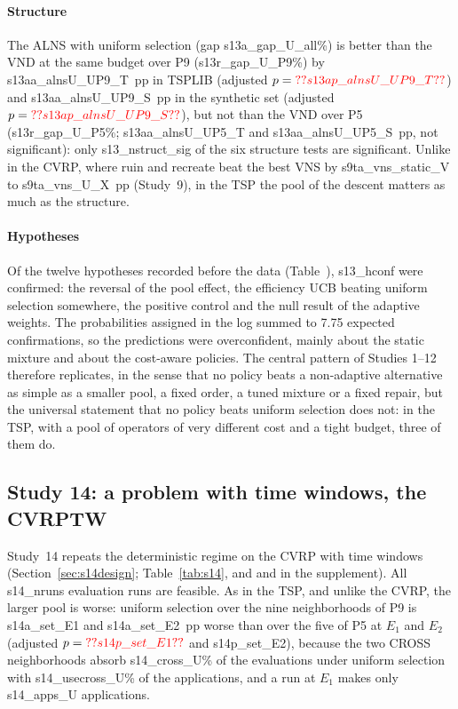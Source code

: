 \paragraph{Structure} The ALNS with uniform selection (gap \num{s13a_gap_U_all}\%) is better than the VND at the same budget over P9 (\num{s13r_gap_U_P9}\%) by \num{s13aa_alnsU_UP9_T}~pp in TSPLIB (adjusted $p=\num{s13ap_alnsU_UP9_T}$) and \num{s13aa_alnsU_UP9_S}~pp in the synthetic set (adjusted $p=\num{s13ap_alnsU_UP9_S}$), but not than the VND over P5 (\num{s13r_gap_U_P5}\%; \num{s13aa_alnsU_UP5_T} and \num{s13aa_alnsU_UP5_S}~pp, not significant): only \num{s13_nstruct_sig} of the six structure tests are significant. Unlike in the CVRP, where ruin and recreate beat the best VNS by \num{s9ta_vns_static_V} to \num{s9ta_vns_U_X}~pp (Study~9), in the TSP the pool of the descent matters as much as the structure.

\paragraph{Hypotheses} Of the twelve hypotheses recorded before the data (Table~), \num{s13_hconf} were confirmed: the reversal of the pool effect, the efficiency UCB beating uniform selection somewhere, the positive control and the null result of the adaptive weights. The probabilities assigned in the log summed to 7.75 expected confirmations, so the predictions were overconfident, mainly about the static mixture and about the cost-aware policies. The central pattern of Studies 1--12 therefore replicates, in the sense that no policy beats a non-adaptive alternative as simple as a smaller pool, a fixed order, a tuned mixture or a fixed repair, but the universal statement that no policy beats uniform selection does not: in the TSP, with a pool of operators of very different cost and a tight budget, three of them do.

\subsection{Study 14: a problem with time windows, the CVRPTW}\label{sec:s14}
Study~14 repeats the deterministic regime on the CVRP with time windows (Section~\ref{sec:s14design}; Table~\ref{tab:s14}, and  and  in the supplement). All \num{s14_nruns} evaluation runs are feasible. As in the TSP, and unlike the CVRP, the larger pool is worse: uniform selection over the nine neighborhoods of P9 is \num{s14a_set_E1} and \num{s14a_set_E2}~pp worse than over the five of P5 at $E_1$ and $E_2$ (adjusted $p=\num{s14p_set_E1}$ and \num{s14p_set_E2}), because the two CROSS neighborhoods absorb \num{s14_cross_U}\% of the evaluations under uniform selection with \num{s14_usecross_U}\% of the applications, and a run at $E_1$ makes only \num{s14_apps_U} applications.

